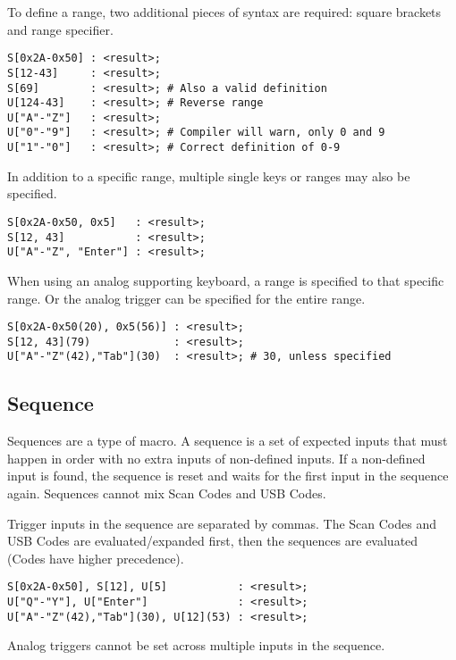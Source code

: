 \documentclass{kiibohd-template}
\begin{document}
To define a range, two additional pieces of syntax are required: square brackets and range specifier.

\begin{lstlisting}
S[0x2A-0x50] : <result>;
S[12-43]     : <result>;
S[69]        : <result>; # Also a valid definition
U[124-43]    : <result>; # Reverse range
U["A"-"Z"]   : <result>;
U["0"-"9"]   : <result>; # Compiler will warn, only 0 and 9
U["1"-"0"]   : <result>; # Correct definition of 0-9
\end{lstlisting}

In addition to a specific range, multiple single keys or ranges may also be specified.

\begin{lstlisting}
S[0x2A-0x50, 0x5]   : <result>;
S[12, 43]           : <result>;
U["A"-"Z", "Enter"] : <result>;
\end{lstlisting}

When using an analog supporting keyboard, a range is specified to that specific range.
Or the analog trigger can be specified for the entire range.

\begin{lstlisting}
S[0x2A-0x50(20), 0x5(56)] : <result>;
S[12, 43](79)             : <result>;
U["A"-"Z"(42),"Tab"](30)  : <result>; # 30, unless specified
\end{lstlisting}


\subsection{Sequence}
\label{subsec:Sequence}

Sequences are a type of macro.
A sequence is a set of expected inputs that must happen in order with no extra inputs of non-defined inputs.
If a non-defined input is found, the sequence is reset and waits for the first input in the sequence again.
Sequences cannot mix Scan Codes and USB Codes.

Trigger inputs in the sequence are separated by commas.
The Scan Codes and USB Codes are evaluated/expanded first, then the sequences are evaluated (Codes have higher precedence).

\begin{lstlisting}
S[0x2A-0x50], S[12], U[5]           : <result>;
U["Q"-"Y"], U["Enter"]              : <result>;
U["A"-"Z"(42),"Tab"](30), U[12](53) : <result>;
\end{lstlisting}

Analog triggers cannot be set across multiple inputs in the sequence.
\end{document}
